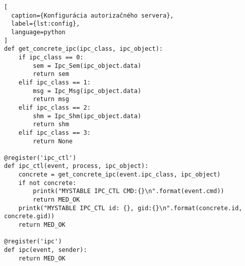 \begin{lstlisting}[
  caption={Konfigurácia autorizačného servera},
  label={lst:config},
  language=python
]
def get_concrete_ipc(ipc_class, ipc_object):
    if ipc_class == 0:
        sem = Ipc_Sem(ipc_object.data)
        return sem
    elif ipc_class == 1:
        msg = Ipc_Msg(ipc_object.data)
        return msg
    elif ipc_class == 2:
        shm = Ipc_Shm(ipc_object.data)
        return shm
    elif ipc_class == 3:
        return None

@register('ipc_ctl')
def ipc_ctl(event, process, ipc_object):
    concrete = get_concrete_ipc(event.ipc_class, ipc_object)
    if not concrete:
        printk("MYSTABLE IPC_CTL CMD:{}\n".format(event.cmd))
        return MED_OK
    printk("MYSTABLE IPC_CTL id: {}, gid:{}\n".format(concrete.id, concrete.gid))
    return MED_OK
    
@register('ipc')
def ipc(event, sender):
    return MED_OK
\end{lstlisting}